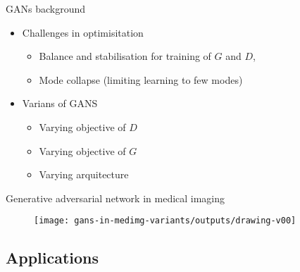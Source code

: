 {

\begin{frame}{GANs background}
\begin{itemize}

\item Challenges in optimisitation
    \begin{itemize}
    \item Balance and stabilisation for training of $G$ and $D$, 
    \item Mode collapse (limiting learning to few modes)
    \end{itemize}

\item Varians of GANS
    \begin{itemize}
    \item Varying objective of $D$
    \item Varying objective of $G$
    \item Varying arquitecture
    \end{itemize}

\end{itemize}

\end{frame}
}



{

\begin{frame}{Generative adversarial network in medical imaging}{}
      \begin{figure}
        \centering
        \texttt{[image: gans-in-medimg-variants/outputs/drawing-v00]}
      \end{figure}
\end{frame}
}






\subsection{Applications}

